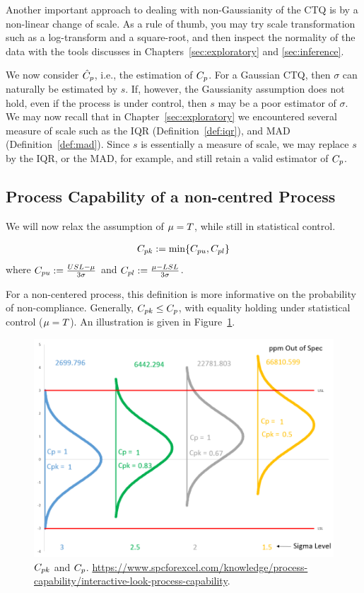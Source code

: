 Another important approach to dealing with non-Gaussianity of the CTQ is by a non-linear change of scale.
As  a rule of thumb, you may try scale transformation such as a log-transform and a square-root, and then inspect the normality of the data with the tools discusses in Chapters~\ref{sec:exploratory} and \ref{sec:inference}.

We now consider $\hat{C}_p$, i.e., the estimation of $\cp$.
For a Gaussian CTQ, then $\sigma$ can naturally be estimated by $s$. 
If, however, the Gaussianity assumption does not hold, even if the process is under control, then $s$ may be a poor estimator of $\sigma$.
We may now recall that in Chapter~\ref{sec:exploratory} we encountered several measure of scale such as the IQR (Definition~\ref{def:iqr}), and MAD (Definition~\ref{def:mad}).
Since $s$ is essentially a measure of scale, we may replace $s$ by the IQR, or the MAD, for example, and still retain a valid estimator of $\cp$.








\subsection{Process Capability of a non-centred Process}
We will now relax the assumption of $\mu=T$, while still in statistical control.

\begin{definition}[$\cpk$]
\begin{align}
	C_{pk}:= \min\{ C_{pu},C_{pl} \}
\end{align}
where $C_{pu}:= \frac{USL- \mu}{3 \sigma}$ and $C_{pl}:= \frac{\mu-LSL}{3 \sigma}$.
\end{definition}
For a non-centered process, this definition is more informative on the probability of non-compliance.
Generally, $C_{pk} \leq C_p$, with equality holding under statistical control ($\mu=T$).
An illustration is given in Figure~\ref{fig:cpk}.

\begin{figure}
\centering
\includegraphics[height=0.3\textheight]{art/Cpk_same_sigma_varying_avg}
\caption[$\cpk$ and $\cp$]{$\cpk$ and $\cp$. \newline
\url{https://www.spcforexcel.com/knowledge/process-capability/interactive-look-process-capability}.}
\label{fig:cpk}
\end{figure}

